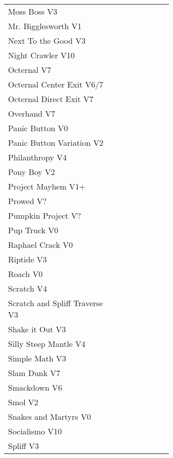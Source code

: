 \begin{flushleft}
\begin{center}
\begin{supertabular}{p{0.65\linewidth}r}
Moss Boss V3 & \pageref{rt:Moss Boss} \\
Mr. Bigglesworth V1 & \pageref{vr:Mr. Bigglesworth} \\
Next To the Good V3 & \pageref{rt:Next To the Good} \\
Night Crawler V10 & \pageref{rt:Night Crawler} \\
Octernal V7 & \pageref{rt:Octernal} \\
Octernal Center Exit V6/7 & \pageref{vr:Octernal Center Exit} \\
Octernal Direct Exit V7 & \pageref{vr:Octernal Direct Exit} \\
Overhand V7 & \pageref{rt:Overhand} \\
Panic Button V0 & \pageref{rt:Panic Button} \\
Panic Button Variation V2 & \pageref{vr:Panic Button Variation} \\
Philanthropy V4 & \pageref{rt:Philanthropy} \\
Pony Boy V2 & \pageref{rt:Pony Boy} \\
Project Mayhem V1+ & \pageref{rt:Project Mayhem} \\
Prowed V? & \pageref{vr:Prowed} \\
Pumpkin Project V? & \pageref{rt:Pumpkin Project} \\
Pup Truck V0 & \pageref{rt:Pup Truck} \\
Raphael Crack V0 & \pageref{rt:Raphael Crack} \\
Riptide V3 & \pageref{rt:Riptide} \\
Roach V0 & \pageref{rt:Roach} \\
Scratch V4 & \pageref{rt:Scratch} \\
Scratch and Spliff Traverse V3 & \pageref{rt:Scratch and Spliff Traverse} \\
Shake it Out V3 & \pageref{vr:Shake it Out} \\
Silly Steep Mantle V4 & \pageref{rt:Silly Steep Mantle} \\
Simple Math V3 & \pageref{rt:Simple Math} \\
Slam Dunk V7 & \pageref{rt:Slam Dunk} \\
Smackdown V6 & \pageref{rt:Smackdown} \\
Smol V2 & \pageref{rt:Smol} \\
Snakes and Martyrs V0 & \pageref{rt:Snakes and Martyrs} \\
Socialismo V10 & \pageref{rt:Socialismo} \\
Spliff V3 & \pageref{rt:Spliff} \\

\end{supertabular}
\end{center}
\end{flushleft}
